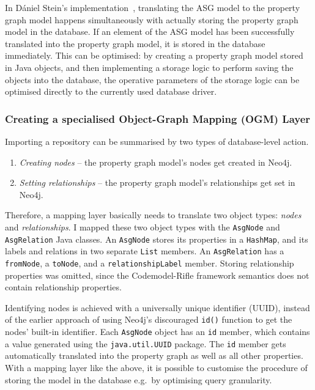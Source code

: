 In Dániel Stein's implementation~\cite{stein-daniel-msc}, translating the ASG model to the property graph model happens simultaneously with actually storing the property graph model in the database. If an element of the ASG model has been successfully translated into the property graph model, it is stored in the database immediately. This can be optimised: by creating a property graph model stored in Java objects, and then implementing a storage logic to perform saving the objects into the database, the operative parameters of the storage logic can be optimised directly to the currently used database driver.

\subsubsection{Creating a specialised Object-Graph Mapping (OGM) Layer}

Importing a repository can be summarised by two types of database-level action.

\begin{enumerate}
\item \emph{Creating nodes} – the property graph model's nodes get created in Neo4j.
\item \emph{Setting relationships} – the property graph model's relationships get set in Neo4j.
\end{enumerate}

Therefore, a mapping layer basically needs to translate two object types: \emph{nodes} and \emph{relationships}. I mapped these two object types with the \lstinline{AsgNode} and \lstinline{AsgRelation} Java classes. An \lstinline{AsgNode} stores its properties in a \lstinline{HashMap}, and its labels and relations in two separate \lstinline{List} members. An \lstinline{AsgRelation} has a \lstinline{fromNode}, a \lstinline{toNode}, and a \lstinline{relationshipLabel} member. Storing relationship properties was omitted, since the Codemodel-Rifle framework semantics does not contain relationship properties.

Identifying nodes is achieved with a universally unique identifier (UUID), instead of the earlier approach of using Neo4j's discouraged \lstinline{id()} function to get the nodes' built-in identifier. Each \lstinline{AsgNode} object has an \lstinline{id} member, which contains a value generated using the \lstinline{java.util.UUID} package. The \lstinline{id} member gets automatically translated into the property graph as well as all other properties. With a mapping layer like the above, it is possible to customise the procedure of storing the model in the database e.g.\ by optimising query granularity.


